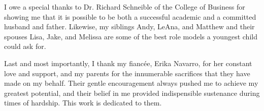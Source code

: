 I owe a special thanks to Dr. Richard Schneible of the College of Business for showing me that it is possible to be both a successful academic and a committed husband and father.
Likewise, my siblings Andy, LeAna, and Matthew and their spouses Lisa, Jake, and Melissa are some of the best role models a youngest child could ask for.

Last and most importantly, I thank my fianc\'ee, Erika Navarro, for her constant love and support, and my parents for the innumerable sacrifices that they have made on my behalf.
Their gentle encouragement always pushed me to achieve my greatest potential, and their belief in me provided indispensible sustenance during times of hardship. 
This work is dedicated to them.
